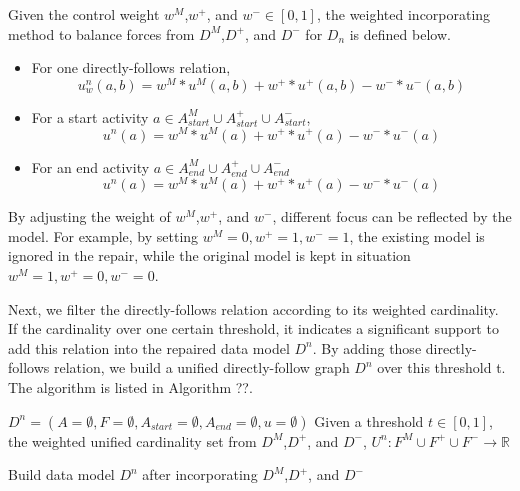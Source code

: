 \begin{definition}
Given the control weight $w^{M}$,$w^{+}$, and $w^{-} \in [0,1]$, the weighted incorporating method to balance forces from $D^M$,$D^+$, and $D^-$ for $D_{n}$ is defined below.
\begin{itemize}
	\item For one directly-follows relation, \[ u^{n}_{w}(a,b) =  w^{M} * u^{M}(a,b)+ w^{+} * u^{+}(a,b)  - w^{-} * u^{-}(a,b) \] 
	\item For a start activity $a \in A^{M}_{start} \cup A^{+}_{start} \cup A^{-}_{start}$,
	\[ u^{n}(a) =  w^{M} * u^{M}(a)+ w^{+} * u^{+}(a)  - w^{-} * u^{-}(a)\]
	\item For an end activity $a \in A^{M}_{end} \cup A^{+}_{end} \cup A^{-}_{end}$
	\[ u^{n}(a) =  w^{M} * u^{M}(a)+ w^{+} * u^{+}(a)  - w^{-} * u^{-}(a)  \]
\end{itemize}	
\end{definition}
By adjusting the weight of $w^{M}$,$w^{+}$, and $w^{-}$, different focus can be reflected by the model. For example, by setting $w^{M}=0, w^{+}=1,w^{-}=1$, the existing model is ignored in the repair, while  the original model is kept in situation $w^{M}=1, w^{+}=0,w^{-}=0$.

Next, we filter the directly-follows relation according to its weighted cardinality. If the cardinality over one certain threshold, it indicates a significant support to add this relation into the repaired data model $D^n$. By adding those directly-follows relation, we build a unified directly-follow graph $D^n$ over this threshold t. The algorithm is listed in Algorithm ??. 
\begin{algorithm}[H]
	\SetAlgoLined
	$D^n=(A=\emptyset, F=\emptyset , A_{start}=\emptyset, A_{end}=\emptyset,u=\emptyset)$\;
	Given a threshold $t \in [0,1]$, 
	the weighted unified cardinality set from $D^M$,$D^+$, and $D^-$, \quad 
	$U^{n}:F^{M} \cup F^{+} \cup F^{-} \rightarrow \mathbb{R}$\;
	\caption{Build data model $D^n$ after incorporating $D^M$,$D^+$, and $D^-$ }
\end{algorithm}
